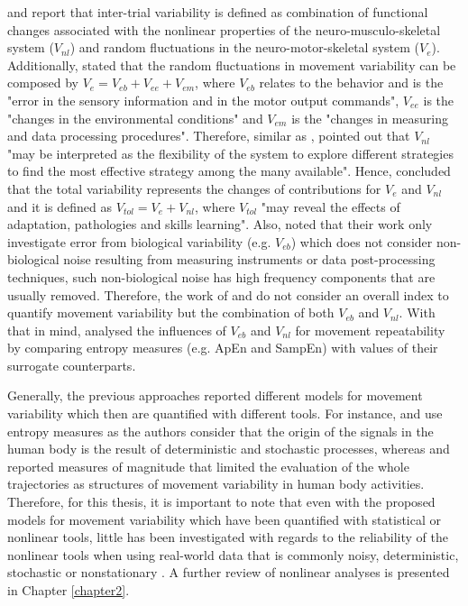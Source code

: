 \cite{preatoni2007} and \cite{preatoni2010, preatoni2013} report  
that inter-trial variability is defined as combination of functional changes 
associated with the nonlinear properties of the neuro-musculo-skeletal 
system ($V_{nl}$) and random fluctuations in the neuro-motor-skeletal 
system ($V_e$).
Additionally, \citealt[p. 72]{preatoni2013} stated that the random fluctuations 
in movement variability can be composed by $V_{e}=V_{eb}+V_{ee}+V_{em}$,
where $V_{eb}$ relates to the behavior and is the "error in the sensory 
information and in the motor output commands",
$V_{ee}$ is the "changes in the environmental conditions" and 
$V_{em}$ is the "changes in measuring and data processing procedures".
Therefore, similar as \cite{hatze1986}, \citealt[p. 77]{preatoni2013} 
pointed out that $V_{nl}$ "may be interpreted as the flexibility of the 
system to explore different strategies to find the most effective 
strategy among the many available".
Hence, \citealt[p. 1328]{preatoni2010} concluded that the total variability 
represents the changes of contributions for $V_e$ and $V_{nl}$ 
and it is defined as $V_{tol}=V_e+V_{nl}$, where $V_{tol}$ 
"may reveal the effects of adaptation, pathologies and skills learning".
Also, \cite{preatoni2013} noted that their work only investigate error from 
biological variability (e.g. $V_{eb}$) which does not consider 
non-biological noise resulting from measuring instruments or 
data post-processing techniques, such 
non-biological noise has high frequency components that are usually removed.
Therefore, the work of \cite{preatoni2010} and \cite{preatoni2013} 
do not consider an overall index to quantify movement variability but 
the combination of both $V_{eb}$ and $V_{nl}$. 
With that in mind, \cite{preatoni2007} analysed the influences of 
$V_{eb}$ and $V_{nl}$ for movement repeatability by comparing entropy measures 
(e.g. ApEn and SampEn) with values of their surrogate counterparts.


Generally, the previous approaches reported different models 
for movement variability which then are quantified with different tools.
For instance, \cite{hatze1986} and \cite{preatoni2010, preatoni2013} 
use entropy measures as the authors consider that the origin of the 
signals in the human body is the result of deterministic and 
stochastic processes, whereas 
\cite{muller2004} and \cite{seifert2011} reported 
measures of magnitude that limited the evaluation of the 
whole trajectories as structures of movement variability in 
human body activities.
Therefore, for this thesis, it is important to note that
even with the proposed models for movement variability 
\citep{hatze1986, preatoni2010, preatoni2013, muller2004, seifert2011} 
which have been quantified with statistical or nonlinear tools,
little has been investigated with regards to the reliability of the nonlinear 
tools when using real-world data that is commonly noisy, 
deterministic, stochastic or nonstationary \citep{newell1998}.
A further review of nonlinear analyses is presented in Chapter \ref{chapter2}.

